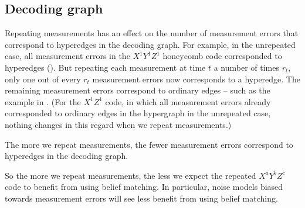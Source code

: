 \subsection{Decoding graph}\label{subsec:repeating_measurements_decoding_graph}

Repeating measurements has an effect on the number of measurement errors that correspond to hyperedges in the decoding graph.
For example, in the unrepeated case, all measurement errors in the $X^1 Y^1 Z^1$ honeycomb code corresponded to hyperedges ().
But repeating each measurement at time $t$ a number of times $r_t$, 
only one out of every $r_t$ measurement errors now corresponds to a hyperedge.
The remaining measurement errors correspond to ordinary edges -- such as the example in .
(For the $X^1 Z^1$ code, in which all measurement errors already corresponded to ordinary edges in the hypergraph in the unrepeated case,
nothing changes in this regard when we repeat measurements.)

\begin{difference}\label{dif:repeated_meas_errors_hyperedges}
    The more we repeat measurements, the fewer measurement errors correspond to hyperedges in the decoding graph.
\end{difference}

So the more we repeat measurements, the less we expect the repeated $X^a Y^b Z^c$ code to benefit from using belief matching.
In particular, noise models biased towards measurement errors will see less benefit from using belief matching.

